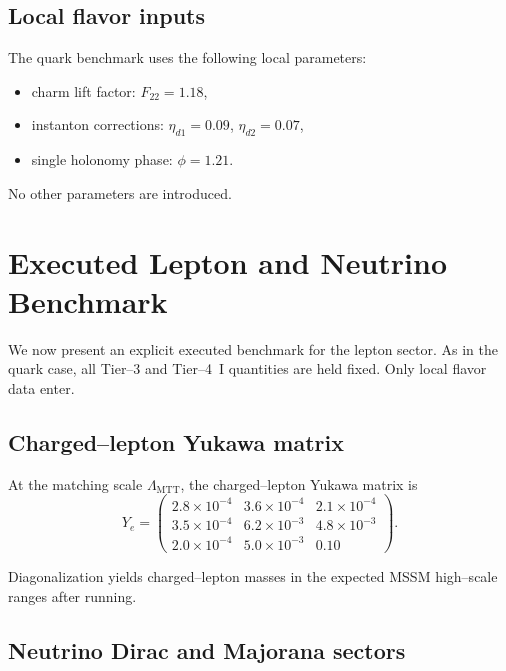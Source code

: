\documentclass[11pt]{article}
\begin{document}
\subsection{Local flavor inputs}

The quark benchmark uses the following local parameters:
\begin{itemize}
  \item charm lift factor: $F_{22}=1.18$,
  \item instanton corrections: $\eta_{d1}=0.09$, $\eta_{d2}=0.07$,
  \item single holonomy phase: $\phi = 1.21$.
\end{itemize}

No other parameters are introduced.
\section{Executed Lepton and Neutrino Benchmark}
\label{sec:lepton-executed}

We now present an explicit executed benchmark for the lepton sector.
As in the quark case, all Tier--3 and Tier--4~I quantities are held fixed.
Only local flavor data enter.

\subsection{Charged--lepton Yukawa matrix}

At the matching scale $\Lambda_{\mathrm{MTT}}$, the charged--lepton
Yukawa matrix is
\begin{equation}
Y_e =
\begin{pmatrix}
2.8\times10^{-4} & 3.6\times10^{-4} & 2.1\times10^{-4} \\
3.5\times10^{-4} & 6.2\times10^{-3} & 4.8\times10^{-3} \\
2.0\times10^{-4} & 5.0\times10^{-3} & 0.10
\end{pmatrix}.
\label{eq:Ye-exec}
\end{equation}

Diagonalization yields charged--lepton masses in the expected MSSM
high--scale ranges after running.

\subsection{Neutrino Dirac and Majorana sectors}
\end{document}
